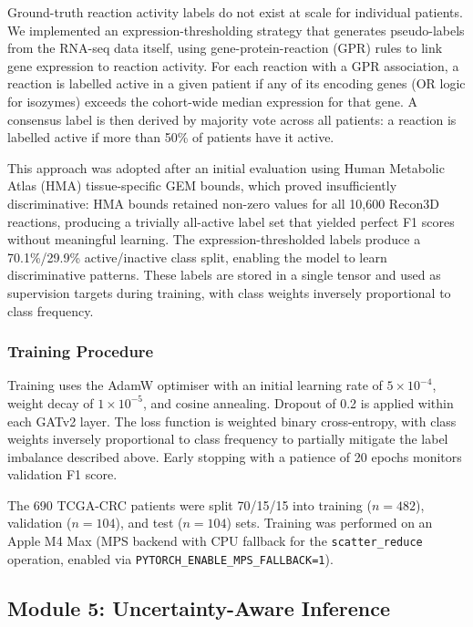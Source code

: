 \documentclass[12pt,a4paper]{article}
\begin{document}
Ground-truth reaction activity labels do not exist at scale for individual patients. We implemented an expression-thresholding strategy that generates pseudo-labels from the RNA-seq data itself, using gene-protein-reaction (GPR) rules to link gene expression to reaction activity. For each reaction with a GPR association, a reaction is labelled active in a given patient if any of its encoding genes (OR logic for isozymes) exceeds the cohort-wide median expression for that gene. A consensus label is then derived by majority vote across all patients: a reaction is labelled active if more than 50\% of patients have it active.

This approach was adopted after an initial evaluation using Human Metabolic Atlas (HMA) tissue-specific GEM bounds, which proved insufficiently discriminative: HMA bounds retained non-zero values for all 10,600 Recon3D reactions, producing a trivially all-active label set that yielded perfect F1 scores without meaningful learning. The expression-thresholded labels produce a 70.1\%/29.9\% active/inactive class split, enabling the model to learn discriminative patterns. These labels are stored in a single tensor and used as supervision targets during training, with class weights inversely proportional to class frequency.

\subsubsection{Training Procedure}

Training uses the AdamW optimiser with an initial learning rate of $5 \times 10^{-4}$, weight decay of $1 \times 10^{-5}$, and cosine annealing. Dropout of 0.2 is applied within each GATv2 layer. The loss function is weighted binary cross-entropy, with class weights inversely proportional to class frequency to partially mitigate the label imbalance described above. Early stopping with a patience of 20 epochs monitors validation F1 score.

The 690 TCGA-CRC patients were split 70/15/15 into training ($n = 482$), validation ($n = 104$), and test ($n = 104$) sets. Training was performed on an Apple M4 Max (MPS backend with CPU fallback for the \texttt{scatter\_reduce} operation, enabled via \texttt{PYTORCH\_ENABLE\_MPS\_FALLBACK=1}).

\subsection{Module 5: Uncertainty-Aware Inference}
\end{document}
